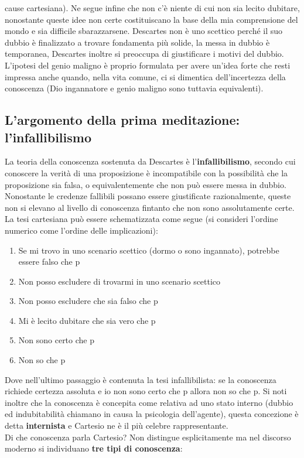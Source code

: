 \documentclass[10pt,a4paper]{article}
\begin{document}
cause cartesiana). Ne segue infine che non c'è niente di cui non sia lecito dubitare, nonostante queste idee non certe costituiscano la base della mia comprensione del mondo e sia difficile sbarazzarsene. Descartes non è uno scettico perché il suo dubbio è finalizzato a trovare fondamenta più solide, la messa in dubbio è temporanea, Descartes inoltre si preoccupa di giustificare i motivi del dubbio. L'ipotesi del genio maligno è proprio formulata per avere un'idea forte che resti impressa anche quando, nella vita comune, ci si dimentica dell'incertezza della conoscenza (Dio ingannatore e genio maligno sono tuttavia equivalenti).
\subsection{L'argomento della prima meditazione: l'infallibilismo}
La teoria della conoscenza sostenuta da Descartes è l'\textbf{infallibilismo}, secondo cui conoscere la verità di una proposizione è incompatibile con la possibilità che la proposizione sia falsa, o equivalentemente che non può essere messa in dubbio. Nonostante le credenze fallibili possano essere giustificate razionalmente, queste non si elevano al livello di conoscenza fintanto che non sono assolutamente certe. La tesi cartesiana può essere schematizzata come segue (si consideri l'ordine numerico come l'ordine delle implicazioni): 
\begin{enumerate}
	\item Se mi trovo in uno scenario scettico (dormo o sono ingannato), potrebbe essere falso che p
	\item Non posso escludere di trovarmi in uno scenario scettico
	\item Non posso escludere che sia falso che p
	\item Mi è lecito dubitare che sia vero che p
	\item Non sono certo che p
	\item Non so che p 
\end{enumerate}
Dove nell'ultimo passaggio è contenuta la tesi infallibilista: se la conoscenza richiede certezza assoluta e io non sono certo che p allora non so che p. Si noti inoltre che la conoscenza è concepita come relativa ad uno stato interno (dubbio ed indubitabilità chiamano in causa la psicologia dell'agente), questa concezione è detta \textbf{internista} e Cartesio ne è il più celebre rappresentante.\\
Di che conoscenza parla Cartesio? Non distingue esplicitamente ma nel discorso moderno si individuano \textbf{tre tipi di conoscenza}:
\end{document}
